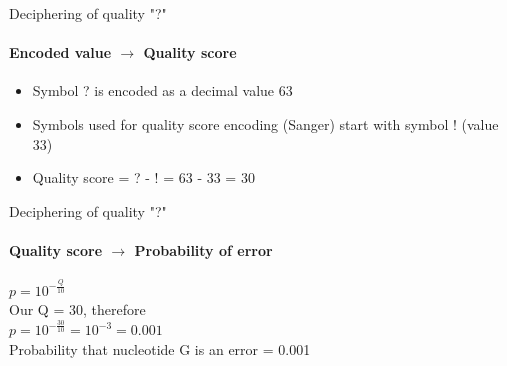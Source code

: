 \documentclass{beamer}
\begin{document}
\begin{frame}{Deciphering of quality "?"}
\framesubtitle{Encoded value $\rightarrow$ Quality score}
\begin{itemize}
  \item Symbol ? is encoded as a decimal value 63
  \item Symbols used for quality score encoding (Sanger) start with symbol ! (value 33)
  \item Quality score = ? - ! = 63 - 33 = 30
\end{itemize}
\end{frame}

\begin{frame}{Deciphering of quality "?"}
\framesubtitle{Quality score $\rightarrow$ Probability of error}

$p = 10^{-\frac{Q}{10}}$ \\
Our Q = 30, therefore\\
$p = 10^{-\frac{30}{10}} = 10^{-3} = 0.001$ \\
Probability that nucleotide G is an error = 0.001

\end{frame}




{
\begin{frame}[plain]
\end{frame}
}
\end{document}
